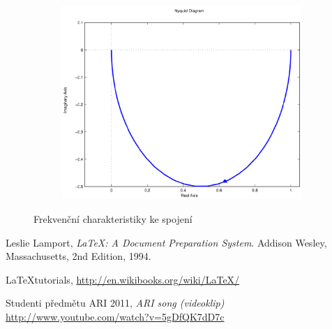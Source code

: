 \documentclass[twoside]{article}
\begin{document}
\begin{figure}[htbp]
\begin{subfigure}{0.25\textwidth}
	\includegraphics[width=\linewidth]{zadani12-f}
  \caption{}
  \label{fig:frekchar:f}
\end{subfigure}
\caption{Frekvenční charakteristiky ke spojení}
\label{fig:frekchar}
\end{figure}




\begin{thebibliography}{9}

  Leslie Lamport,
  \emph{\LaTeX: A Document Preparation System}.
  Addison Wesley, Massachusetts,
  2nd Edition,
  1994.

	\LaTeX tutorials, \url{http://en.wikibooks.org/wiki/LaTeX/}

	Studenti předmětu ARI 2011, \emph{ARI song (videoklip)} \url{http://www.youtube.com/watch?v=5gDfQK7dD7c}
\end{thebibliography}
\end{document}

